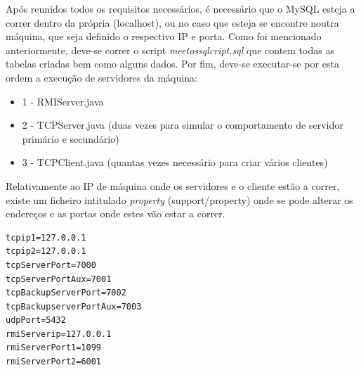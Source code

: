 \documentclass[12pt]{article} %
\begin{document}
Após reunidos todos os requisitos necessários, é necessário que o MySQL esteja a correr dentro da própria (localhost), ou no caso que esteja se encontre noutra máquina, que seja definido o respectivo IP e porta.
Como foi mencionado anteriormente, deve-se correr o script \emph{meetossqlcript.sql} que contem todas as tabelas criadas bem como alguns dados.
Por fim, deve-se executar-se por esta ordem a execução de servidores da máquina:

\begin{itemize}
	\item 1 - RMIServer.java
 	\item 2 - TCPServer.java (duas vezes para simular o comportamento de servidor primário e secundário)
	\item 3 - TCPClient.java (quantas vezes necessário para criar vários clientes)
\end{itemize}

Relativamente ao IP de máquina onde os servidores e o cliente estão a correr, existe um ficheiro intitulado \emph{property} (support/property) onde se pode alterar os endereços e as portas onde estes vão estar a correr.

\begin{verbatim}
tcpip1=127.0.0.1
tcpip2=127.0.0.1
tcpServerPort=7000
tcpServerPortAux=7001
tcpBackupServerPort=7002
tcpBackupserverPortAux=7003
udpPort=5432
rmiServerip=127.0.0.1
rmiServerPort1=1099
rmiServerPort2=6001

\end{verbatim}
\end{document}
